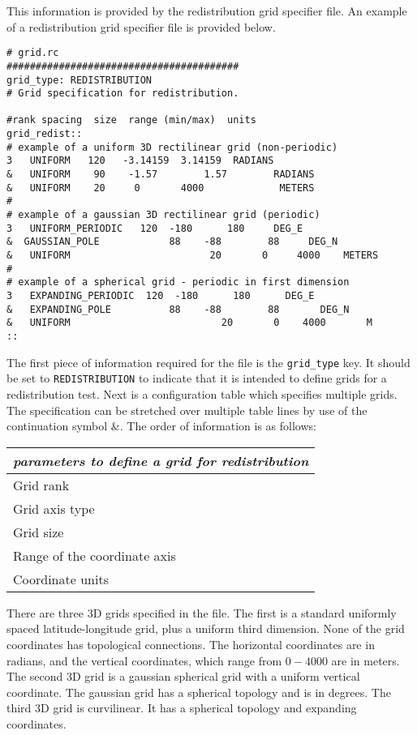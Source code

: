 This information is provided by the redistribution grid specifier file.
An example of a redistribution grid specifier file is provided below. 
\begin{center}
\begin{verbatim}
# grid.rc
########################################
grid_type: REDISTRIBUTION
# Grid specification for redistribution.

#rank spacing  size  range (min/max)  units
grid_redist::
# example of a uniform 3D rectilinear grid (non-periodic)
3   UNIFORM   120   -3.14159  3.14159  RADIANS   
&   UNIFORM    90    -1.57        1.57        RADIANS   
&   UNIFORM    20     0       4000             METERS   
#
# example of a gaussian 3D rectilinear grid (periodic)
3   UNIFORM_PERIODIC   120  -180      180     DEG_E   
&  GAUSSIAN_POLE            88    -88        88     DEG_N   
&   UNIFORM                        20       0     4000    METERS
#
# example of a spherical grid - periodic in first dimension
3   EXPANDING_PERIODIC  120  -180      180      DEG_E   
&   EXPANDING_POLE          88    -88        88       DEG_N 
&   UNIFORM                          20       0    4000       M
::
\end{verbatim}
\end{center}

The first piece of information required for the file is the \texttt{grid\_type} key. It should be set to \texttt{REDISTRIBUTION} to indicate that it is intended to define grids for a redistribution test. Next is a configuration table which specifies multiple grids. The specification can be stretched over multiple table lines by use of the continuation symbol $\&$. The order of information is as follows:
\begin{center}
\begin{tabular}{| l |} \hline 
{\em parameters to define a grid for redistribution }  \\
\hline \hline
 Grid rank    \\
 Grid axis type   \\
 Grid size \\
 Range of the coordinate axis  \\
 Coordinate units \\
\hline 
\end{tabular}
\end{center}
 
 There are three 3D grids specified in the file. The first is a standard uniformly spaced latitude-longitude grid, plus a uniform third dimension. None of the grid coordinates has topological connections. The horizontal coordinates are in radians, and the vertical coordinates, which range from $0-4000$ are in meters. The second 3D grid is a gaussian spherical grid with a uniform vertical coordinate. The gaussian grid has a spherical topology and is in degrees. The third 3D grid is curvilinear. It has a spherical topology and expanding coordinates. 
 
